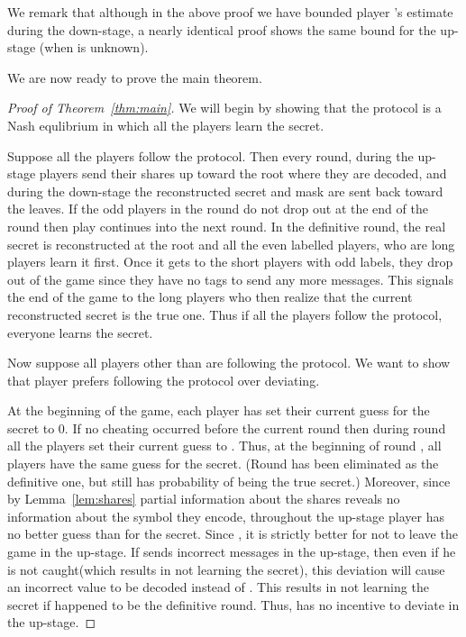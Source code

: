 \documentclass[12pt]{article}
\theoremstyle{definition}
\begin{document}
We remark that although in the above proof we have bounded player 's
estimate during the down-stage,  a nearly identical proof shows the same bound for the 
up-stage (when  is unknown).

We are now ready to prove the main theorem. 

\begin{proof}[Proof of Theorem~\ref{thm:main}]
We will begin by showing that the protocol is a Nash equlibrium 
in which all the players learn the secret.

Suppose all the players follow the protocol. Then every round, during the 
up-stage players send their shares up toward the root where they are decoded, 
and during the down-stage the reconstructed secret and mask are sent back 
toward the leaves.  If the odd players in the round do not drop out at the 
end of the round then play continues into the next round. In the definitive 
round, the real secret is reconstructed at the root and all the even 
labelled players, who are long players learn it first. Once it gets to the 
short players with odd labels, they drop out of the game since they have no 
tags to send any more messages. This signals the end of the game to the long 
players who then realize that the current reconstructed secret is the true one. 
Thus if all the players follow the protocol, everyone learns the secret.

Now suppose all players other than  are following the protocol. We want 
to show that player  prefers following the protocol over 
deviating.  

At the beginning of the game, each player has set their current guess for the 
secret to 0. If no cheating occurred before the current round  then 
during round
 all the players set their current guess to . Thus, at the 
beginning of round , all players have the same guess for the secret. 
(Round  has been eliminated as the definitive one, but  still has 
probability  of being the true secret.) Moreover, since by 
Lemma~\ref{lem:shares} partial information about the shares 
reveals no information about the symbol they encode, throughout 
the up-stage player  has no better guess than  for the secret.
Since , it is strictly better for  not to leave the game in the 
up-stage. If  sends incorrect messages in the up-stage, then even if he 
is not caught(which results in not learning the secret), this deviation will 
cause an incorrect value to be decoded instead of .  This results in 
not learning the secret if  happened to be the definitive round. Thus, 
 has no incentive to deviate in the up-stage. 


\end{proof}
\end{document}
